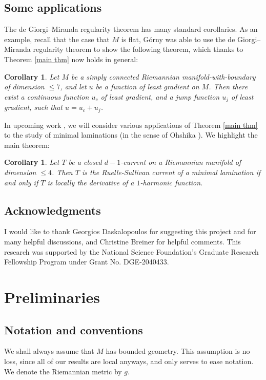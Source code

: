 \documentclass[reqno,11pt]{amsart}
\newtheorem{corollary}[theorem]{Corollary}
\theoremstyle{definition}
\numberwithin{equation}{section}
\begin{document}
\subsection{Some applications}
The de Giorgi--Miranda regularity theorem has many standard corollaries.
As an example, recall that the case that $M$ is flat, G\'orny \cite[Theorem 1.2]{górny2017planar} was able to use the de Giorgi--Miranda regularity theorem to show the following theorem, which thanks to Theorem \ref{main thm} now holds in general:

\begin{corollary}
Let $M$ be a simply connected Riemannian manifold-with-boundary of dimension $\leq 7$, and let $u$ be a function of least gradient on $M$.
Then there exist a continuous function $u_c$ of least gradient, and a jump function $u_j$ of least gradient, such that $u = u_c + u_j$.
\end{corollary}

In upcoming work \cite{BackusCML,BackusInfinityMaxwell1}, we will consider various applications of Theorem \ref{main thm} to the study of minimal laminations (in the sense of Ohshika \cite{Ohshika90}).
We highlight the main theorem:

\begin{corollary}
Let $T$ be a closed $d-1$-current on a Riemannian manifold of dimension $\leq 4$.
Then $T$ is the Ruelle-Sullivan current of a minimal lamination if and only if $T$ is locally the derivative of a $1$-harmonic function.
\end{corollary}

\subsection{Acknowledgments}
I would like to thank Georgios Daskalopoulos for suggesting this project and for many helpful discussions, and Christine Breiner for helpful comments.
This research was supported by the National Science Foundation's Graduate Research Fellowship Program under Grant No. DGE-2040433.

\section{Preliminaries}\label{Prelims}
\subsection{Notation and conventions}
We shall always assume that $M$ has bounded geometry.
This assumption is no loss, since all of our results are local anyways, and only serves to ease notation.
We denote the Riemannian metric by $g$.
\end{document}
